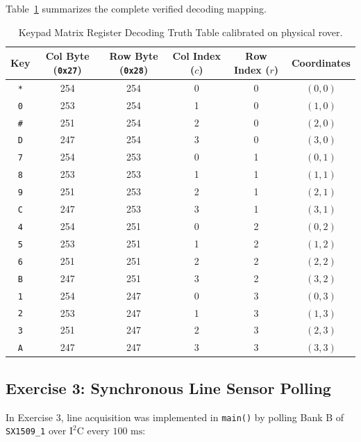Table~\ref{tab:keypad_map} summarizes the complete verified decoding mapping.

\begin{table}[htbp]
    \centering
    \small
    \caption{Keypad Matrix Register Decoding Truth Table calibrated on physical rover.}
    \label{tab:keypad_map}
    \begin{tabular}{cccccc}
        \toprule
        \textbf{Key} & \textbf{Col Byte (\texttt{0x27})} & \textbf{Row Byte (\texttt{0x28})} & \textbf{Col Index ($c$)} & \textbf{Row Index ($r$)} & \textbf{Coordinates} \\
        \midrule
        \texttt{*} & 254 & 254 & 0 & 0 & $(0, 0)$ \\
        \texttt{0} & 253 & 254 & 1 & 0 & $(1, 0)$ \\
        \texttt{\#} & 251 & 254 & 2 & 0 & $(2, 0)$ \\
        \texttt{D} & 247 & 254 & 3 & 0 & $(3, 0)$ \\
        \midrule
        \texttt{7} & 254 & 253 & 0 & 1 & $(0, 1)$ \\
        \texttt{8} & 253 & 253 & 1 & 1 & $(1, 1)$ \\
        \texttt{9} & 251 & 253 & 2 & 1 & $(2, 1)$ \\
        \texttt{C} & 247 & 253 & 3 & 1 & $(3, 1)$ \\
        \midrule
        \texttt{4} & 254 & 251 & 0 & 2 & $(0, 2)$ \\
        \texttt{5} & 253 & 251 & 1 & 2 & $(1, 2)$ \\
        \texttt{6} & 251 & 251 & 2 & 2 & $(2, 2)$ \\
        \texttt{B} & 247 & 251 & 3 & 2 & $(3, 2)$ \\
        \midrule
        \texttt{1} & 254 & 247 & 0 & 3 & $(0, 3)$ \\
        \texttt{2} & 253 & 247 & 1 & 3 & $(1, 3)$ \\
        \texttt{3} & 251 & 247 & 2 & 3 & $(2, 3)$ \\
        \texttt{A} & 247 & 247 & 3 & 3 & $(3, 3)$ \\
        \bottomrule
    \end{tabular}
\end{table}

\subsection{Exercise 3: Synchronous Line Sensor Polling}
In Exercise 3, line acquisition was implemented in \texttt{main()} by polling Bank B of \texttt{SX1509\_1} over $\text{I}^2\text{C}$ every $100\text{ ms}$:

